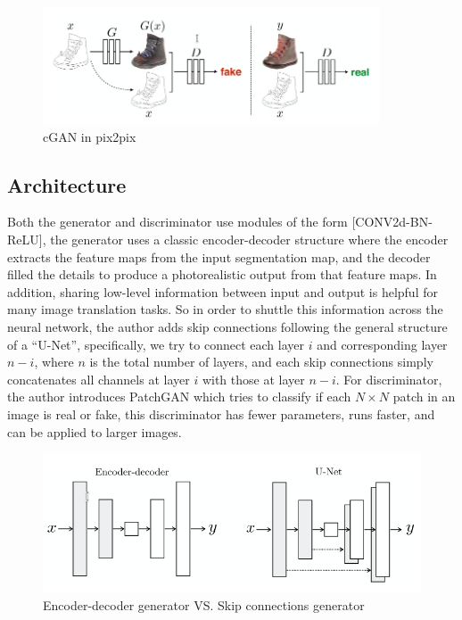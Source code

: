 \begin{figure}[H]
    \begin{center}
    \includegraphics[width=10cm]{figures/pix2pix-cGAN}
    \end{center}
    \caption{cGAN in pix2pix}
    \label{fig:pix2pix-cGAN}
\end{figure}

\subsection{Architecture}
Both the generator and discriminator use modules of the form [CONV2d-BN-ReLU], 
the generator uses a classic encoder-decoder structure where the encoder extracts
the feature maps from the input segmentation map, and the decoder filled the details 
to produce a photorealistic output from that feature maps. In addition, sharing 
low-level information between input and output is helpful for many image translation
tasks. So in order to shuttle this information across the neural network, the author
adds skip connections following the general structure of a “U-Net”, specifically, we
try to connect each layer $i$ and corresponding layer $n-i$, where $n$ is the total number
of layers, and each skip connections simply concatenates all channels at layer $i$ 
with those at layer $n-i$. For discriminator, the author introduces PatchGAN which 
tries to classify if each $N \times N$ patch in an image is real or fake, this
discriminator has fewer parameters, runs faster, and can be applied to larger images.
\begin{figure}[H]
    \begin{center}
    \includegraphics[width=12cm]{figures/pix2pix-generator}
    \end{center}
    \caption{Encoder-decoder generator VS. Skip connections generator}
    \label{fig:pix2pix-generator}
\end{figure}

